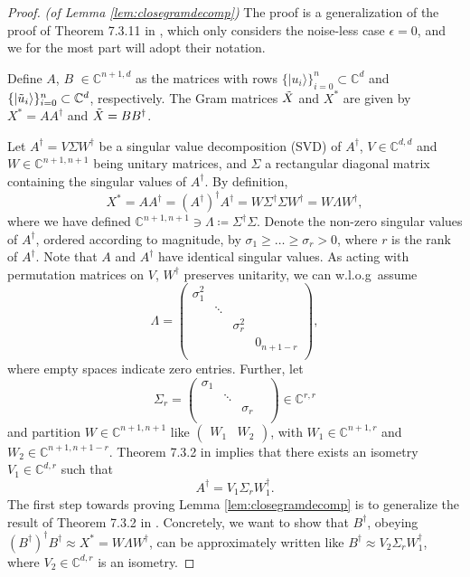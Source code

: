 \begin{proof}\emph{(of Lemma \ref{lem:closegramdecomp})}\hfill\break
The proof is a generalization of the proof of Theorem 7.3.11 in \cite{Horn2013}, which only considers the noise-less case $\epsilon=0$, and we for the most part will adopt their notation. 

Define $A$, $B$ $\in\mathbb{C}^{n+1,d}$ as the matrices with rows $\{\vert u_i\rangle\}_{i=0}^n\subset\mathbb{C}^{d}$ and $\{\vert \Tilde{u}_i \rangle\}_{i=0}^n\subset\mathbb{C}^{d}$, respectively. The Gram matrices $\Tilde{X}$ and $X^*$ are given by $X^*=AA^{\dag}$ and $\Tilde{X}=BB^{\dag}$. 

Let $A^\dag = V\Sigma W^\dag$ be a singular value decomposition (SVD) of $A^\dag$, $V\in\mathbb{C}^{d,d}$ and $W\in\mathbb{C}^{n+1,n+1}$ being unitary matrices, and $\Sigma$ a rectangular diagonal matrix containing the singular values of $A^\dag$. By definition, 
\begin{equation*}
X^*=AA^\dag=(A^\dag)^{\dag} A^{\dag} = W\Sigma^\dag\Sigma W^\dag = W\Lambda W^\dag,
\end{equation*} where we have defined $\mathbb{C}^{n+1,n+1}\ni\Lambda\coloneqq\Sigma^\dag\Sigma$. Denote the non-zero singular values of $A^\dag$, ordered according to magnitude, by $\sigma_1 \geq \dots \geq \sigma_r > 0$, where $r$ is the rank of $A^\dag$. Note that $A$ and $A^{\dag}$ have identical singular values. As acting with permutation matrices on $V$, $W^{\dag}$ preserves unitarity, we can w.l.o.g\ assume
\begin{equation*}
\Lambda = 
\begin{pmatrix}
\sigma_1^2 & & & \\
& \ddots & & \\
& & \sigma_r^2 & \\
& & & 0_{n+1-r}\\
\end{pmatrix},
\end{equation*}
where empty spaces indicate zero entries.
Further, let
\begin{equation*}
\Sigma_r = 
\begin{pmatrix}
\sigma_1 & &\\
& \ddots & & \\
& & \sigma_r\\
\end{pmatrix}\in\mathbb{C}^{r,r}
\end{equation*} and partition $W\in\mathbb{C}^{n+1,n+1}$ like 
$\begin{pmatrix}
W_1 & W_2
\end{pmatrix}$, with $W_1\in\mathbb{C}^{n+1,r}$ and $W_2\in\mathbb{C}^{n+1,n+1-r}$. Theorem 7.3.2 in \cite{Horn2013} implies that there exists an isometry $V_1\in\mathbb{C}^{d,r}$ such that 
\begin{equation*}
A^{\dag}=V_1\Sigma_r W_1^{\dag}.
\end{equation*}
The first step towards proving Lemma \ref{lem:closegramdecomp} is to generalize the result of Theorem 7.3.2 in \cite{Horn2013}. Concretely, we want to show that $B^{\dag}$, obeying $(B^{\dag})^{\dag}B^{\dag}\approx X^* = W\Lambda W^{\dag}$, can be approximately written like $B^{\dag}\approx V_2\Sigma_rW_1^{\dag}$, where $V_2\in\mathbb{C}^{d,r}$ is an isometry.


\end{proof}
